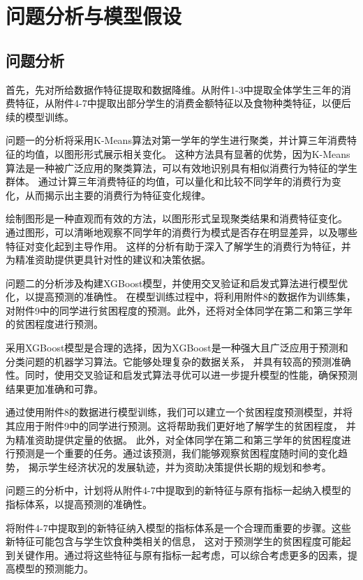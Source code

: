 \documentclass{article}
\begin{document}
\section{问题分析与模型假设}

\subsection{问题分析}

首先，先对所给数据作特征提取和数据降维。从附件1-3中提取全体学生三年的消费特征，从附件4-7中提取出部分学生的消费金额特征以及食物种类特征，以便后续的模型训练。

问题一的分析将采用K-Means算法对第一学年的学生进行聚类，并计算三年消费特征的均值，以图形形式展示相关变化。
这种方法具有显著的优势，因为K-Means算法是一种被广泛应用的聚类算法，可以有效地识别具有相似消费行为特征的学生群体。
通过计算三年消费特征的均值，可以量化和比较不同学年的消费行为变化，从而揭示出主要的消费行为特征变化规律。

绘制图形是一种直观而有效的方法，以图形形式呈现聚类结果和消费特征变化。
通过图形，可以清晰地观察不同学年的消费行为模式是否存在明显差异，以及哪些特征对变化起到主导作用。
这样的分析有助于深入了解学生的消费行为特征，并为精准资助提供更具针对性的建议和决策依据。

问题二的分析涉及构建XGBoost模型，并使用交叉验证和启发式算法进行模型优化，以提高预测的准确性。
在模型训练过程中，将利用附件8的数据作为训练集，对附件9中的同学进行贫困程度的预测。此外，还将对全体同学在第二和第三学年的贫困程度进行预测。

采用XGBoost模型是合理的选择，因为XGBoost是一种强大且广泛应用于预测和分类问题的机器学习算法。它能够处理复杂的数据关系，
并具有较高的预测准确性。同时，使用交叉验证和启发式算法寻优可以进一步提升模型的性能，确保预测结果更加准确和可靠。

通过使用附件8的数据进行模型训练，我们可以建立一个贫困程度预测模型，并将其应用于附件9中的同学进行预测。这将帮助我们更好地了解学生的贫困程度，
并为精准资助提供定量的依据。
此外，对全体同学在第二和第三学年的贫困程度进行预测是一个重要的任务。通过该预测，我们能够观察贫困程度随时间的变化趋势，
揭示学生经济状况的发展轨迹，并为资助决策提供长期的规划和参考。

问题三的分析中，计划将从附件4-7中提取到的新特征与原有指标一起纳入模型的指标体系，以提高预测的准确性。

将附件4-7中提取到的新特征纳入模型的指标体系是一个合理而重要的步骤。这些新特征可能包含与学生饮食种类相关的信息，
这对于预测学生的贫困程度可能起到关键作用。通过将这些特征与原有指标一起考虑，可以综合考虑更多的因素，提高模型的预测能力。
\end{document}

